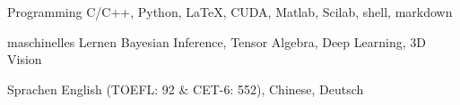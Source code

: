 


\begin{cvskills}


\cvskill
{Programming} %
{C/C++, Python, LaTeX, CUDA, Matlab, Scilab, shell, markdown} %


\cvskill
{maschinelles Lernen} %
{Bayesian Inference, Tensor Algebra, Deep Learning, 3D Vision} %


\cvskill
{Sprachen} %
{English (TOEFL: 92 \& CET-6: 552), Chinese, Deutsch} %


\end{cvskills}
